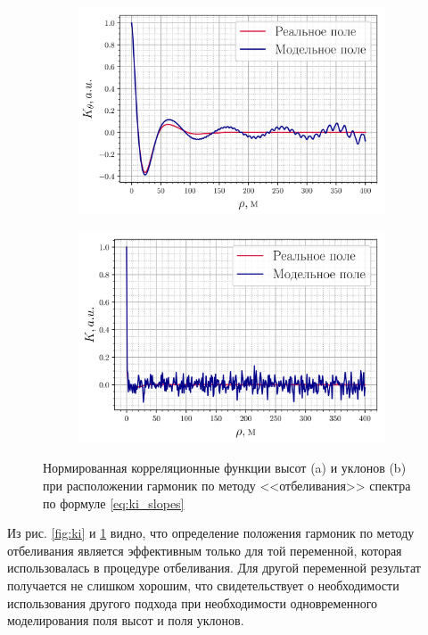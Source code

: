 \begin{figure}[h!]
    \centering
    \begin{subfigure}{0.49\linewidth}
        \centering
        \includegraphics[width=\linewidth]{fig/correlation_height_slopes2.png}
        \caption{}
    \end{subfigure}
    \begin{subfigure}{0.49\linewidth}
        \centering
        \includegraphics[width=\linewidth]{fig/correlation_angles_slopes2.png}
    \end{subfigure}
    \caption{Нормированная корреляционные функции высот (a) и уклонов (b) при расположении гармоник
    по методу <<отбеливания>> спектра по формуле \eqref{eq:ki_slopes} }
    \label{fig:ki_slopes}
\end{figure}

Из рис. \ref{fig:ki} и \ref{fig:ki_slopes} видно, что определение положения
гармоник по методу отбеливания является эффективным только для той переменной,
которая использовалась в процедуре отбеливания. Для другой переменной результат
получается не слишком хорошим, что свидетельствует о необходимости
использования другого подхода при необходимости одновременного моделирования
поля высот и поля уклонов.

